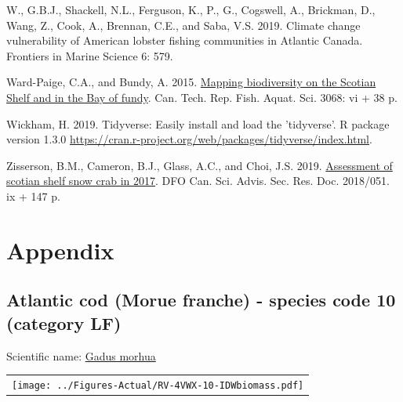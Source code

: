 \documentclass[12pt]{article}\usepackage[]{graphicx}\usepackage[]{color}
\begin{document}
\leavevmode\hypertarget{ref-Greenan:2019}{}%
W., G.B.J., Shackell, N.L., Ferguson, K., P., G., Cogswell, A., Brickman, D., Wang, Z., Cook, A., Brennan, C.E., and Saba, V.S. 2019. Climate change vulnerability of American lobster fishing communities in Atlantic Canada. Frontiers in Marine Science 6: 579.

\leavevmode\hypertarget{ref-WardPaige2016}{}%
Ward-Paige, C.A., and Bundy, A. 2015. \href{https://waves-vagues.dfo-mpo.gc.ca/Library/363944.pdf}{Mapping biodiversity on the Scotian Shelf and in the Bay of fundy}. Can. Tech. Rep. Fish. Aquat. Sci. 3068: vi + 38 p.

\leavevmode\hypertarget{ref-R:Tidyverse}{}%
Wickham, H. 2019. Tidyverse: Easily install and load the 'tidyverse'. R package version 1.3.0 \url{https://cran.r-project.org/web/packages/tidyverse/index.html}.

\leavevmode\hypertarget{ref-Zisserson2019}{}%
Zisserson, B.M., Cameron, B.J., Glass, A.C., and Choi, J.S. 2019. \href{http://publications.gc.ca/collections/collection_2020/mpo-dfo/fs70-5/Fs70-5-2018-051-eng.pdf}{ Assessment of scotian shelf snow crab in 2017}. DFO Can. Sci. Advis. Sec. Res. Doc. 2018/051. ix + 147 p.

\pagebreak

\hypertarget{appendix}{%
\section{Appendix}\label{appendix}}

\pagebreak 

\renewcommand\thefigure{\thesubsection\Alph{figure}}

\setcounter{figure}{0}

\hypertarget{sec:10}{%
\subsection{Atlantic cod (Morue franche) - species code 10 (category LF)}\label{sec:10}}

  


Scientific name: \href{http://www.marinespecies.org/aphia.php?p=taxdetails\&id=126436}{Gadus morhua} \newline
\begin{minipage}{1.0\textwidth}
 \begin{tabular}{c}
\texttt{[image: ../Figures-Actual/RV-4VWX-10-IDWbiomass.pdf]} \\ 
\end{tabular} 
\end{minipage}
\newline
\end{document}
